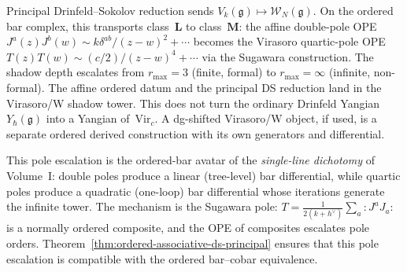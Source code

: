 \begin{remark}%
\label{rem:pole-escalation}%
%
%
Principal Drinfeld--Sokolov reduction sends
$V_k(\mathfrak{g}) \mapsto \mathcal{W}_N(\mathfrak{g})$.
On the ordered bar complex, this transports class~$\mathbf{L}$
to class~$\mathbf{M}$: the affine double-pole OPE
$J^a(z)J^b(w) \sim k\delta^{ab}/(z{-}w)^2 + \cdots$
becomes the Virasoro quartic-pole OPE
$T(z)T(w) \sim (c/2)/(z{-}w)^4 + \cdots$ via the Sugawara
construction. The shadow depth escalates from $r_{\max} = 3$
(finite, formal) to $r_{\max} = \infty$ (infinite, non-formal).
The affine ordered datum and the principal DS reduction land in the
Virasoro/W shadow tower. This does not turn the ordinary Drinfeld
Yangian $Y_\hbar(\mathfrak g)$ into a Yangian of~$\mathrm{Vir}_c$.
A dg-shifted Virasoro/W object, if used, is a separate ordered
derived construction with its own generators and differential.

This pole escalation is the ordered-bar avatar of the
\emph{single-line dichotomy} of Volume~I: double poles
produce a linear (tree-level) bar differential, while
quartic poles produce a quadratic (one-loop) bar differential
whose iterations generate the infinite tower.
The mechanism is the Sugawara pole:
$T = \tfrac{1}{2(k+h^\vee)} \sum_a {:}J^a J_a{:}$
is a normally ordered composite, and the OPE of composites
escalates pole orders. Theorem~\ref{thm:ordered-associative-ds-principal}
ensures that this pole escalation is compatible with
the ordered bar--cobar equivalence.
\end{remark}
